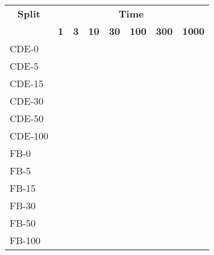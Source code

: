 \begin{tabular}{| l | r | r | r | r | r | r | r |}
    \hline

    \multicolumn{1}{|c|}{\textbf{Split}} &
    \multicolumn{7}{|c|}{\textbf{Time}} \\

    \multicolumn{1}{|c|}{} &
    \multicolumn{1}{|c|}{\textbf{1}} &
    \multicolumn{1}{|c|}{\textbf{3}} &
    \multicolumn{1}{|c|}{\textbf{10}} &
    \multicolumn{1}{|c|}{\textbf{30}} &
    \multicolumn{1}{|c|}{\textbf{100}} &
    \multicolumn{1}{|c|}{\textbf{300}} &
    \multicolumn{1}{|c|}{\textbf{1000}} \\

    \hline \hline

    CDE-0   &  &  &  \\
    CDE-5   &  &  &  \\
    CDE-15  &  &  &  \\
    CDE-30  &  &  &  \\
    CDE-50  &  &  &  \\
    CDE-100 &  &  &  \\

    \hline

    FB-0    &  &  &  \\
    FB-5    &  &  &  \\
    FB-15   &  &  &  \\
    FB-30   &  &  &  \\
    FB-50   &  &  &  \\
    FB-100  &  &  &  \\

    \hline
\end{tabular}
